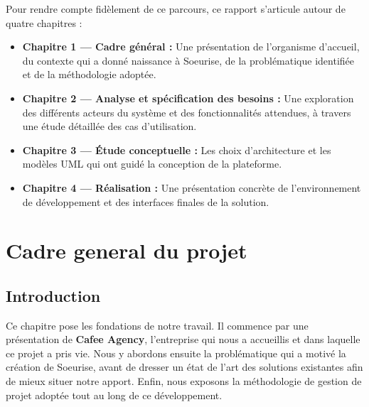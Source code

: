 \documentclass[12pt,a4paper]{report}
\begin{document}
	\medskip
	
	Pour rendre compte fidèlement de ce parcours, ce rapport s'articule autour 
	de quatre chapitres :
	
	\begin{itemize}
		\item \textbf{Chapitre 1 --- Cadre général :} Une présentation de 
		l'organisme d'accueil, du contexte qui a donné naissance à Soeurise, 
		de la problématique identifiée et de la méthodologie adoptée.
		
		\item \textbf{Chapitre 2 --- Analyse et spécification des besoins :} 
		Une exploration des différents acteurs du système et des fonctionnalités 
		attendues, à travers une étude détaillée des cas d'utilisation.
		
		\item \textbf{Chapitre 3 --- Étude conceptuelle :} Les choix 
		d'architecture et les modèles UML qui ont guidé la conception 
		de la plateforme.
		
		\item \textbf{Chapitre 4 --- Réalisation :} Une présentation concrète 
		de l'environnement de développement et des interfaces finales 
		de la solution.
	\end{itemize}
	\chapter{Cadre general du projet}
	
	\section{Introduction}
	Ce chapitre pose les fondations de notre travail. Il commence par une présentation 
	de \textbf{Cafee Agency}, l'entreprise qui nous a accueillis et dans laquelle ce 
	projet a pris vie. Nous y abordons ensuite la problématique qui a motivé la création 
	de Soeurise, avant de dresser un état de l'art des solutions existantes afin de mieux 
	situer notre apport. Enfin, nous exposons la méthodologie de gestion de projet adoptée 
	tout au long de ce développement.
	
\end{document}
